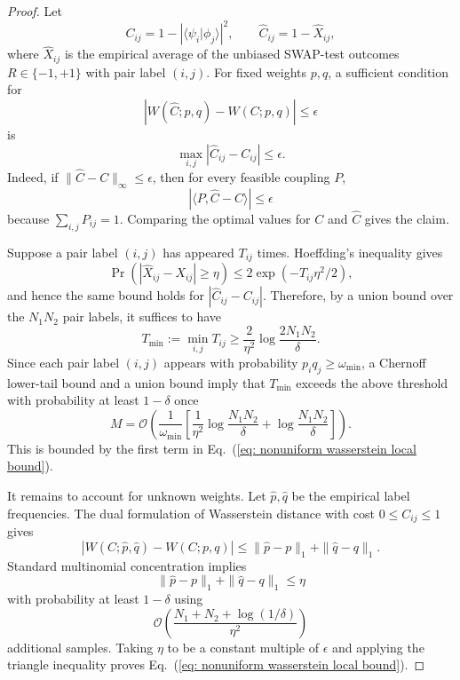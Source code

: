 \documentclass[aps,prx,reprint,superscriptaddress,amsmath,amssymb,longbibliography,floatfix]{revtex4-2}
\newcommand{\Abs}[1]{\left\lvert #1\right\rvert}
\providecommand{\braket}[2]{\langle #1|#2 \rangle}
\newcommand{\scO}{\mathcal{O}}
\theoremstyle{plain}
\theoremstyle{definition}
\theoremstyle{remark}
\begin{document}
\begin{proof}
Let
\[
    C_{ij}=1-\Abs{\braket{\psi_i}{\phi_j}}^2,
    \qquad
    \widehat C_{ij}=1-\widehat X_{ij},
\]
where \(\widehat X_{ij}\) is the empirical average of the unbiased SWAP-test outcomes \(R\in\{-1,+1\}\) with pair label \((i,j)\). For fixed weights \(p,q\), a sufficient condition for
\[
    \Abs{W(\widehat C;p,q)-W(C;p,q)}\le \epsilon
\]
is
\[
    \max_{i,j}\Abs{\widehat C_{ij}-C_{ij}}\le \epsilon .
\]
Indeed, if \(\|\widehat C-C\|_\infty\le\epsilon\), then for every feasible coupling \(P\),
\[
    \Abs{\langle P,\widehat C-C\rangle}\le \epsilon
\]
because \(\sum_{i,j}P_{ij}=1\). Comparing the optimal values for \(C\) and \(\widehat C\) gives the claim.

Suppose a pair label \((i,j)\) has appeared \(T_{ij}\) times. Hoeffding's inequality gives
\[
    \Pr\!\left(
        \Abs{\widehat X_{ij}-X_{ij}}\ge \eta
    \right)
    \le
    2\exp(-T_{ij}\eta^2/2),
\]
and hence the same bound holds for \(\Abs{\widehat C_{ij}-C_{ij}}\). Therefore, by a union bound over the \(N_1N_2\) pair labels, it suffices to have
\begin{equation}
    T_{\min}:=\min_{i,j}T_{ij}
    \ge
    \frac{2}{\eta^2}\log\frac{2N_1N_2}{\delta}.
\label{eq:app-nonuniform-wasserstein-pair-count}
\end{equation}
Since each pair label \((i,j)\) appears with probability \(p_iq_j\ge\omega_{\min}\), a Chernoff lower-tail bound and a union bound imply that \(T_{\min}\) exceeds the above threshold with probability at least \(1-\delta\) once
\[
    M
    =
    \scO\!\left(
        \frac1{\omega_{\min}}
        \left[
            \frac1{\eta^2}\log\frac{N_1N_2}{\delta}
            +
            \log\frac{N_1N_2}{\delta}
        \right]
    \right).
\]
This is bounded by the first term in Eq.~(\ref{eq: nonuniform wasserstein local bound}).

It remains to account for unknown weights. Let \(\widehat p,\widehat q\) be the empirical label frequencies. The dual formulation of Wasserstein distance with cost \(0\le C_{ij}\le1\) gives
\begin{equation}
    \Abs{W(C;\widehat p,\widehat q)-W(C;p,q)}
    \le
    \|\widehat p-p\|_1+\|\widehat q-q\|_1.
\label{eq:app-nonuniform-wasserstein-weight-stability}
\end{equation}
Standard multinomial concentration implies
\[
    \|\widehat p-p\|_1+\|\widehat q-q\|_1\le \eta
\]
with probability at least \(1-\delta\) using
\[
    \scO\!\left(
        \frac{N_1+N_2+\log(1/\delta)}{\eta^2}
    \right)
\]
additional samples. Taking \(\eta\) to be a constant multiple of \(\epsilon\) and applying the triangle inequality proves Eq.~(\ref{eq: nonuniform wasserstein local bound}).
\end{proof}
\end{document}
